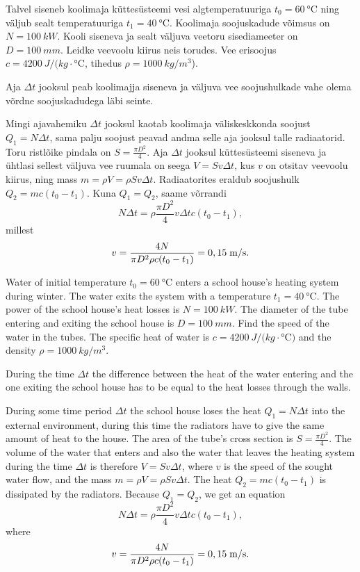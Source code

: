 
Talvel siseneb koolimaja küttesüsteemi vesi algtemperatuuriga $t_0=\SI{60}{\degreeCelsius}$
ning väljub sealt temperatuuriga $t_1=\SI{40}{\degreeCelsius}$. Koolimaja soojuskadude
võimsus on $N=\SI{100}{kW}$. Kooli siseneva ja sealt väljuva veetoru sisediameeter on
$D=\SI{100}{mm}$. Leidke veevoolu kiirus neis torudes. Vee erisoojus
$c=\SI{4200}{J/(kg\cdot\degreeCelsius}$, tihedus $\rho=\SI{1000}{kg/m^3}$).

\hint
Aja $\Delta t$ jooksul peab koolimajja siseneva ja väljuva vee soojushulkade vahe olema võrdne soojuskadudega läbi seinte.

\solu
Mingi ajavahemiku $\Delta t$ jooksul kaotab koolimaja väliskeskkonda soojust $Q_1=N\Delta t$, sama palju soojust peavad andma selle aja jooksul talle radiaatorid. Toru ristlõike pindala on $S=\frac{\pi D^2}{4}$. Aja $\Delta t$ jooksul küttesüsteemi siseneva ja ühtlasi sellest väljuva vee ruumala on seega $V=Sv\Delta t$, kus $v$ on otsitav veevoolu kiirus, ning mass $m=\rho V=\rho Sv\Delta t$. Radiaatorites eraldub soojushulk $Q_2=mc(t_0-t_1)$. Kuna $Q_1=Q_2$, saame võrrandi
\[
N\Delta t=\rho \frac{\pi D^2}{4}v\Delta t c (t_0-t_1),
\]
millest
\[
v=\frac{4N}{\pi D^2\rho c (t_0-t_1)}=0,15\;\hbox{m/s}.
\]

Water of initial temperature $t_0=\SI{60}{\degreeCelsius}$ enters a school house’s heating system during winter. The water exits the system with a temperature $t_1=\SI{40}{\degreeCelsius}$. The power of the school house’s heat losses is $N=\SI{100}{kW}$. The diameter of the tube entering and exiting the school house is $D=\SI{100}{mm}$. Find the speed of the water in the tubes. The specific heat of water is $c=\SI{4200}{J/(kg\cdot\degreeCelsius)}$ and the density $\rho=\SI{1000}{kg/m^3}$.

\hinteng
During the time $\Delta t$ the difference between the heat of the water entering and the one exiting the school house has to be equal to the heat losses through the walls.

\solueng
During some time period $\Delta t$ the school house loses the heat $Q_1=N\Delta t$ into the external environment, during this time the radiators have to give the same amount of heat to the house. The area of the tube's cross section is $S=\frac{\pi D^2}{4}$. The volume of the water that enters and also the water that leaves the heating system during the time $\Delta t$ is therefore $V=Sv\Delta t$, where $v$ is the speed of the sought water flow, and the mass $m=\rho V=\rho Sv\Delta t$. The heat $Q_2=mc(t_0-t_1)$ is dissipated by the radiators. Because $Q_1=Q_2$, we get an equation
\[
N\Delta t=\rho \frac{\pi D^2}{4}v\Delta t c (t_0-t_1),
\] 
where 
\[
v=\frac{4N}{\pi D^2\rho c (t_0-t_1)}=0,15\;\hbox{m/s}.
\]
\probend